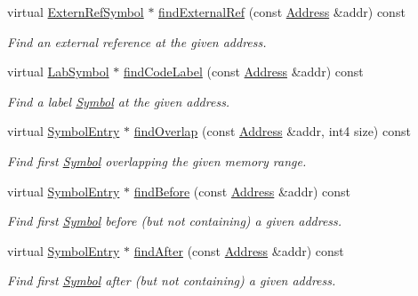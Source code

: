 \begin{DoxyCompactItemize}
virtual \mbox{\hyperlink{class_extern_ref_symbol}{Extern\+Ref\+Symbol}} $\ast$ \mbox{\hyperlink{class_scope_internal_a7e440965cfb5642bcc751a622e5ec58d}{find\+External\+Ref}} (const \mbox{\hyperlink{class_address}{Address}} \&addr) const
\begin{DoxyCompactList}\small\item\em Find an {\itshape external} {\itshape reference} at the given address. \end{DoxyCompactList}\item 
virtual \mbox{\hyperlink{class_lab_symbol}{Lab\+Symbol}} $\ast$ \mbox{\hyperlink{class_scope_internal_a602029280a3bc0dac8aac016ec934d5b}{find\+Code\+Label}} (const \mbox{\hyperlink{class_address}{Address}} \&addr) const
\begin{DoxyCompactList}\small\item\em Find a label \mbox{\hyperlink{class_symbol}{Symbol}} at the given address. \end{DoxyCompactList}\item 
virtual \mbox{\hyperlink{class_symbol_entry}{Symbol\+Entry}} $\ast$ \mbox{\hyperlink{class_scope_internal_a3c241113085be88a74f73d2431de72f3}{find\+Overlap}} (const \mbox{\hyperlink{class_address}{Address}} \&addr, int4 size) const
\begin{DoxyCompactList}\small\item\em Find first \mbox{\hyperlink{class_symbol}{Symbol}} overlapping the given memory range. \end{DoxyCompactList}\item 
virtual \mbox{\hyperlink{class_symbol_entry}{Symbol\+Entry}} $\ast$ \mbox{\hyperlink{class_scope_internal_a28ae6dd136a8b285c667206417ec14a5}{find\+Before}} (const \mbox{\hyperlink{class_address}{Address}} \&addr) const
\begin{DoxyCompactList}\small\item\em Find first \mbox{\hyperlink{class_symbol}{Symbol}} before (but not containing) a given address. \end{DoxyCompactList}\item 
virtual \mbox{\hyperlink{class_symbol_entry}{Symbol\+Entry}} $\ast$ \mbox{\hyperlink{class_scope_internal_a922323cc754778858646c2bb82b69e17}{find\+After}} (const \mbox{\hyperlink{class_address}{Address}} \&addr) const
\begin{DoxyCompactList}\small\item\em Find first \mbox{\hyperlink{class_symbol}{Symbol}} after (but not containing) a given address. \end{DoxyCompactList}\item 

\end{DoxyCompactItemize}
